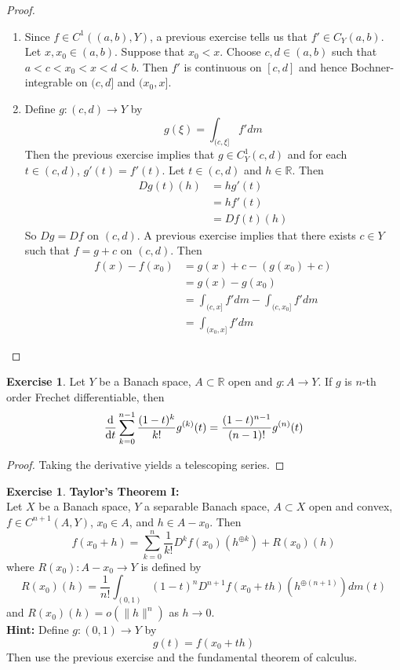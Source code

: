 \documentclass[12pt]{amsart}
\theoremstyle{definition}
\newtheorem{ex}[definition]{Exercise}
\newcommand{\R}{\mathbb{R}}
\newcommand{\lex}[1]{\label{ex:#1}}
\begin{document}
	\begin{proof}
	\begin{enumerate}
	\item Since $f \in C^1((a,b), Y)$, a previous exercise tells us that $f' \in C_Y(a,b)$. Let $x, x_0 \in (a,b)$. Suppose that $x_0 < x$. Choose $c,d \in (a,b)$ such that $a < c < x_0< x< d < b$. Then $f'$ is continuous on $[c,d]$ and hence Bochner-integrable on $(c,d]$ and $(x_0,x]$. 
	\item Define $g: (c,d) \rightarrow Y$ by $$g(\xi) = \int_{(c, \xi]}f'dm$$
	Then the previous exercise implies that $g \in C^1_Y(c,d)$ and for each $t \in (c, d)$, $g'(t) = f'(t)$. Let $t \in (c,d)$ and $h \in \R$. Then
	\begin{align*}
	Dg(t)(h) 
	&= hg'(t) \\
	&= hf'(t) \\
	&= Df(t)(h)
	\end{align*}
	So $Dg = Df$ on $(c,d)$. A previous exercise implies that there exists $c \in Y$ such that $f = g + c$ on $(c, d)$. Then 
	\begin{align*}
	f(x) - f(x_0)
	&= g(x)+c - (g(x_0)+c) \\
	&= g(x) - g(x_0) \\
	&= \int_{(c, x]}f'dm - \int_{(c, x_0]}f'dm\\
	&= \int_{(x_0, x]}f'dm
	\end{align*}
	\end{enumerate}
	\end{proof}
	
	
	\begin{ex} \lex{}
	Let $Y$ be a Banach space, $A \subset \R$ open and $g:A \rightarrow Y$. If $g$ is $n$-th order Frechet differentiable, then 
	$$\dv{t} \sum_{k=0}^{n-1} \frac{(1-t)^k}{k!}g^{(k)}(t) = \frac{(1-t)^{n-1}}{(n-1)!}g^{(n)}(t)$$
	\end{ex}
	
	\begin{proof}
	Taking the derivative yields a telescoping series.
	\end{proof}
	
	
	
	\begin{ex} \lex{} \textbf{Taylor's Theorem I:}\\
	Let $X$ be a Banach space, $Y$ a separable Banach space, $A \subset X$ open and convex, $f\in C^{n+1}(A, Y)$, $x_0 \in A$, and $h \in A - x_0$. Then $$f(x_0 + h) = \sum_{k=0}^{n} \frac{1}{k!} D^k f(x_0)(h^{\oplus k}) + R(x_0)(h)$$ 
	where $R(x_0): A - x_0 \rightarrow Y$ is defined by $$R(x_0)(h) = \frac{1}{n!}\int_{(0,1)} (1-t)^{n}D^{n+1}f(x_0 + th)(h^{\oplus (n+1)})d m(t)$$
	and $R(x_0)(h) = o(\|h\|^{n})$ as $h \rightarrow 0$.\\
	\textbf{Hint:} Define $g: (0,1) \rightarrow Y$ by $$g(t) = f(x_0 +t h)$$ Then use the previous exercise and the fundamental theorem of calculus.
	\end{ex}
	
\end{document}
